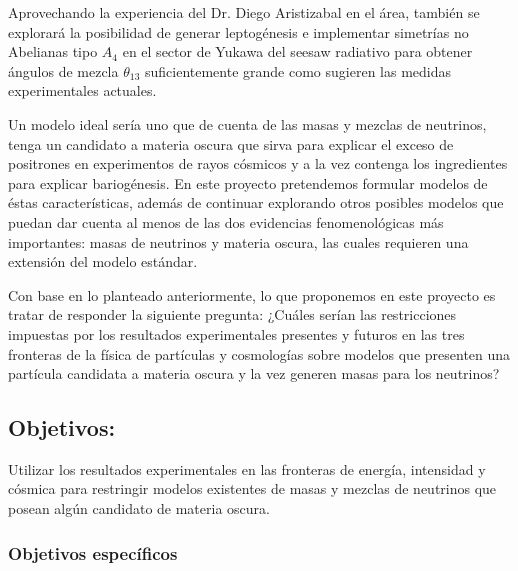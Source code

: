 \begin{leptogenesis}
  Aprovechando la experiencia del Dr. Diego Aristizabal en el área,
  también se explorará la posibilidad de generar leptogénesis e
  implementar simetrías no Abelianas tipo $A_4$ en el sector de Yukawa
  del seesaw radiativo para obtener ángulos de mezcla $\theta_{13}$
  suficientemente grande como sugieren las medidas experimentales
  actuales.
\end{leptogenesis}

Un modelo ideal sería uno que de cuenta de las masas y mezclas de
neutrinos, tenga un candidato a materia oscura que sirva para explicar
el exceso de positrones en experimentos de rayos cósmicos y a la vez
contenga los ingredientes para explicar bariogénesis.  En este
proyecto pretendemos formular modelos de éstas características, además
de continuar explorando otros posibles modelos que puedan dar cuenta
al menos de las dos evidencias fenomenológicas más importantes: masas
de neutrinos y materia oscura, las cuales requieren una extensión del
modelo estándar.


Con base en lo planteado anteriormente, lo que proponemos en este
proyecto es tratar de responder la siguiente pregunta: ¿Cuáles serían
las restricciones impuestas por los resultados experimentales
presentes y futuros en las tres fronteras de la física de partículas y
cosmologías sobre modelos que presenten una partícula candidata a
materia oscura y la vez generen masas para los neutrinos?
 

\subsection{Objetivos:                                     }
Utilizar los resultados experimentales en las fronteras de energía,
intensidad y cósmica para restringir modelos existentes de masas y
mezclas de neutrinos que posean algún candidato de materia oscura.

\subsubsection{Objetivos específicos}

